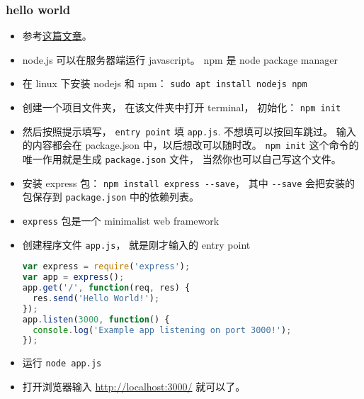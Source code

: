 
\begin{issues}
\issueDraft
\end{issues}


\subsubsection{hello world}
\begin{itemize}
\item 参考\href{https://medium.com/@adnanrahic/hello-world-app-with-node-js-and-express-c1eb7cfa8a30}{这篇文章}。
\item node.js 可以在服务器端运行 javascript。 npm 是 node package manager
\item 在 linux 下安装 nodejs 和 npm： \verb|sudo apt install nodejs npm|
\item 创建一个项目文件夹， 在该文件夹中打开 terminal， 初始化： \verb|npm init|
\item 然后按照提示填写， \verb|entry point| 填 \verb`app.js`. 不想填可以按回车跳过。 输入的内容都会在 package.json 中，以后想改可以随时改。 \verb|npm init| 这个命令的唯一作用就是生成 \verb`package.json` 文件， 当然你也可以自己写这个文件。
\item 安装 express 包： \verb|npm install express --save|， 其中 \verb|--save| 会把安装的包保存到 \verb|package.json| 中的依赖列表。
\item \verb|express| 包是一个 minimalist web framework
\item 创建程序文件 \verb|app.js|， 就是刚才输入的 entry point
\begin{lstlisting}[language=js]
var express = require('express');
var app = express();
app.get('/', function(req, res) {
  res.send('Hello World!');
});
app.listen(3000, function() {
  console.log('Example app listening on port 3000!');
});
\end{lstlisting}
\item 运行 \verb|node app.js|
\item 打开浏览器输入 \href{http://localhost:3000/}{http://localhost:3000/} 就可以了。
\end{itemize}
